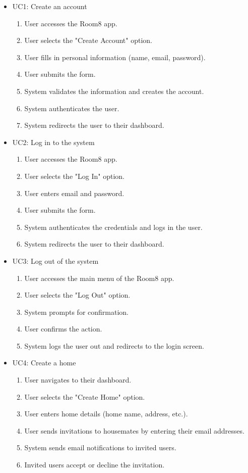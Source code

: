\documentclass{scrreprt}
\theoremstyle{definition}
\begin{document}
\begin{itemize}
    \item UC1: Create an account
    \begin{enumerate}
        \item User accesses the Room8 app.
        \item User selects the "Create Account" option.
        \item User fills in personal information (name, email, password).
        \item User submits the form.
        \item System validates the information and creates the account.
        \item System authenticates the user.
        \item System redirects the user to their dashboard.
    \end{enumerate}
    
    \item UC2: Log in to the system
    \begin{enumerate}
        \item User accesses the Room8 app.
        \item User selects the "Log In" option.
        \item User enters email and password.
        \item User submits the form.
        \item System authenticates the credentials and logs in the user.
        \item System redirects the user to their dashboard.
    \end{enumerate}
    
    \item UC3: Log out of the system
    \begin{enumerate}
        \item User accesses the main menu of the Room8 app.
        \item User selects the "Log Out" option.
        \item System prompts for confirmation.
        \item User confirms the action.
        \item System logs the user out and redirects to the login screen.
    \end{enumerate}
    
    \item UC4: Create a home
    \begin{enumerate}
        \item User navigates to their dashboard.
        \item User selects the "Create Home" option.
        \item User enters home details (home name, address, etc.).
        \item User sends invitations to housemates by entering their email addresses.
        \item System sends email notifications to invited users.
        \item Invited users accept or decline the invitation.
    \end{enumerate}
    

\end{itemize}
\end{document}
